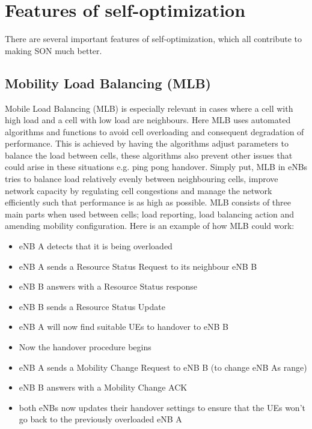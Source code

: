 \documentclass{report}
\begin{document}
\section{Features of self-optimization}
There are several important features of self-optimization, which all contribute to making SON much better. 

\subsection{Mobility Load Balancing (MLB)}
Mobile Load Balancing (MLB) is especially relevant in cases where a cell with high load and a cell with low load are neighbours. Here MLB uses automated algorithms and functions to avoid cell overloading and consequent degradation of performance. This is achieved by having the algorithms adjust parameters to balance the load between cells, these algorithms also prevent other issues that could arise in these situations e.g. ping pong handover. 
Simply put, MLB in eNBs tries to balance load relatively evenly between neighbouring cells, improve network capacity by regulating cell congestions and manage the network efficiently such that performance is as high as possible.
MLB consists of three main parts when used between cells; load reporting, load balancing action and amending mobility configuration.
Here is an example of how MLB could work:
\begin{itemize}
	\item eNB A detects that it is being overloaded
	\item eNB A sends a Resource Status Request to its neighbour eNB B
	\item eNB B answers with a Resource Status response
	\item eNB B sends a Resource Status Update
	\item eNB A will now find suitable UEs to handover to eNB B
	\item Now the handover procedure begins
	\item eNB A sends a Mobility Change Request to eNB B (to change eNB As range)
	\item eNB B answers with a Mobility Change ACK
	\item both eNBs now updates their handover settings to ensure that the UEs won't go back to the previously overloaded eNB A
\end{itemize}
\end{document}
